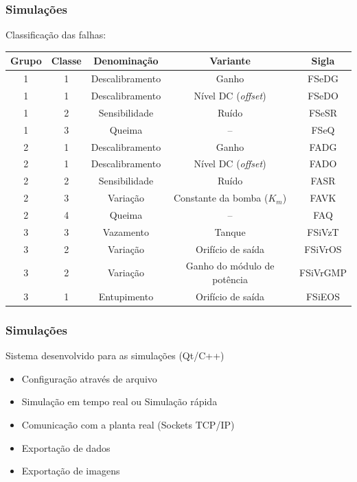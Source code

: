 \documentclass{beamer}
\begin{document}
\begin{frame}
    \frametitle{Simulações}

    Classificação das falhas:

\begin{table}[!htb]
\scriptsize
\centering
\begin{tabular}{|c|c|c|c|c|}
\hline
{\bf Grupo} & {\bf Classe} & {\bf Denominação} & {\bf Variante} & {\bf Sigla}\\
\hline
\hline
1 & 1 & Descalibramento & Ganho & FSeDG\\
\hline
1 & 1 & Descalibramento & Nível DC ({\it offset}) & FSeDO\\
\hline
1 & 2 & Sensibilidade & Ruído & FSeSR\\
\hline
1 & 3 & Queima & -- & FSeQ\\
\hline
\hline
2 & 1 & Descalibramento & Ganho & FADG\\
\hline
2 & 1 & Descalibramento & Nível DC ({\it offset}) & FADO\\
\hline
2 & 2 & Sensibilidade & Ruído & FASR\\
\hline
2 & 3 & Variação & Constante da bomba ($K_m$) & FAVK\\
\hline
2 & 4 & Queima & -- & FAQ\\
\hline
\hline
3 & 3 & Vazamento & Tanque & FSiVzT\\
\hline
3 & 2 & Variação & Orifício de saída & FSiVrOS\\
\hline
3 & 2 & Variação & Ganho do módulo de potência & FSiVrGMP\\
\hline
3 & 1 & Entupimento & Orifício de saída & FSiEOS\\
\hline
\end{tabular}
\end{table}
\end{frame}

\begin{frame}
    \frametitle{Simulações}

    Sistema desenvolvido para as simulações (Qt/C++)

\begin{itemize}
    \item Configuração através de arquivo
    \item Simulação em tempo real ou Simulação rápida
    \item Comunicação com a planta real (Sockets TCP/IP)
    \item Exportação de dados
    \item Exportação de imagens
\end{itemize}

\end{frame}
\end{document}

